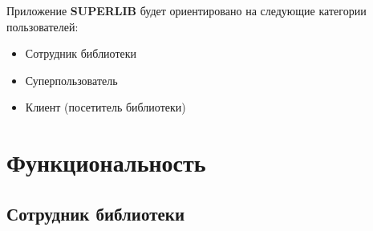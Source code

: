 \documentclass[a4paper,10pt]{article}
\begin{document}
     
        Приложение \textbf{SUPERLIB} будет ориентировано на следующие категории пользователей: 

        \begin{itemize}
            \item Сотрудник библиотеки
            \item Суперпользователь
            \item Клиент (посетитель библиотеки)
        \end{itemize}


    \newpage

    \section{Функциональность }

     
        \subsection{Сотрудник библиотеки}
\end{document}
